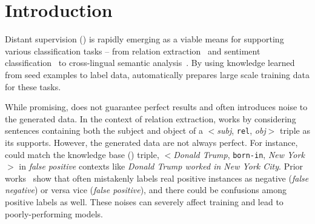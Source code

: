 \section{Introduction}

Distant supervision (\DS) is rapidly emerging as a viable means for supporting various classification tasks -- from relation extraction~\cite{mintz2009distant} and sentiment classification~\cite{go2009twitter} to cross-lingual semantic
analysis~\cite{fang2016learning}.
By using knowledge learned from seed examples to label data, \DS automatically prepares large scale training data for these tasks.




While promising, \DS does not guarantee perfect results and often introduces noise to the
generated data. In the context of relation extraction,
\DS works by considering sentences containing both the subject and object of a $<$\emph{subj}, \texttt{rel}, \emph{obj}$>$ triple as its supports. However, the generated data are not always perfect. For instance,
\DS could match the knowledge base (\KB) triple, $<$\emph{Donald Trump},
\texttt{born-in}, \emph{New York}$>$  in \emph{false positive} contexts like \emph{Donald Trump worked in New York City}.
Prior works~\cite{takamatsu2012reducing,ritter2013modeling} show that \DS often mistakenly labels real positive instances as negative (\emph{false negative}) or
versa vice (\emph{false positive}), and there could be  confusions among positive labels as well.
These noises can severely affect training and lead to poorly-performing models.

